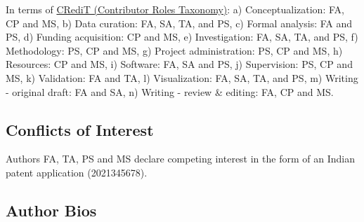 \documentclass[12 pt]{article}
\begin{document}
In terms of \href{https://casrai.org/credit/}{CRediT (Contributor Roles Taxonomy)}: a) Conceptualization: FA, CP and MS, b) Data curation: FA, SA, TA, and PS, c) Formal analysis: FA and PS, d) Funding acquisition: CP and MS, e) Investigation: FA, SA, TA, and PS, f) Methodology: PS, CP and MS, g) Project administration: PS, CP and MS, h) Resources: CP and MS, i) Software: FA, SA and PS, j) Supervision: PS, CP and MS, k) Validation: FA and TA, l) Visualization: FA, SA, TA, and PS, m) Writing - original draft: FA and SA, n) Writing - review \& editing: FA, CP and MS.

\subsection*{Conflicts of Interest}
Authors FA, TA, PS and MS declare competing interest in the form of an Indian patent application (2021345678).

\subsection*{Author Bios}
  
\end{document}
